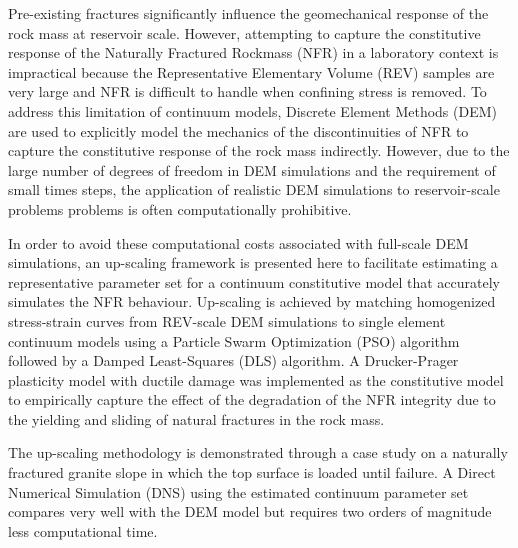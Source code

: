 Pre-existing fractures significantly influence the geomechanical response of the rock mass at reservoir scale. However, attempting to capture the constitutive response of the Naturally Fractured Rockmass (NFR) in a laboratory context is impractical because the Representative Elementary Volume (REV) samples are very large and NFR is difficult to handle when confining stress is removed. To address this limitation of continuum models, Discrete Element Methods (DEM) are used to explicitly model the mechanics of the discontinuities of NFR to capture the constitutive response of the rock mass indirectly. However, due to the large number of degrees of freedom in DEM simulations and the requirement of small times steps, the application of realistic DEM simulations to reservoir-scale problems problems is often computationally prohibitive. 

In order to avoid these computational costs associated with full-scale DEM simulations, an up-scaling framework is presented here to facilitate estimating a representative parameter set for a continuum constitutive model that accurately simulates the NFR behaviour. Up-scaling is achieved by matching homogenized stress-strain curves from REV-scale DEM simulations to single element continuum models using a Particle Swarm Optimization (PSO) algorithm followed by a Damped Least-Squares (DLS) algorithm. A Drucker-Prager plasticity model with ductile damage was implemented as the constitutive model to empirically capture the effect of the degradation of the NFR integrity due to the yielding and sliding of natural fractures in the rock mass.

The up-scaling methodology is demonstrated through a case study on a naturally fractured granite slope in which the top surface is loaded until failure. A Direct Numerical Simulation (DNS) using the estimated continuum parameter set compares very well with the DEM model but requires two orders of magnitude less computational time.